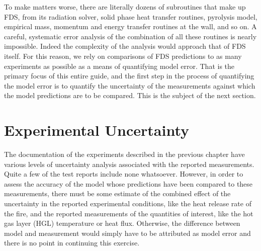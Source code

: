 To make matters worse, there are literally dozens of subroutines that make up FDS, from its radiation solver, solid phase heat transfer routines, pyrolysis model,
empirical mass, momentum and energy transfer routines at the wall, and so on. A careful, systematic error analysis of the combination of all these routines is
nearly impossible. Indeed the complexity of the analysis would approach that of FDS itself. For this reason, we rely on comparisons of FDS predictions to as many
experiments as possible as a means of quantifying model error. That is the primary focus of this entire guide, and the first step in the process of quantifying the
model error is to quantify the uncertainty of the measurements against which the model predictions are to be compared. This is the subject of the next section.


\section{Experimental Uncertainty}

The documentation of the experiments described in the previous chapter have various levels of uncertainty analysis associated with the reported measurements. Quite a
few of the test reports include none whatsoever.
However, in order to assess the accuracy of the model whose predictions have been compared to these measurements, there must be some estimate of the
combined effect of the uncertainty in the reported experimental conditions, like the heat release rate of the fire,
and the reported measurements of the quantities of interest, like the hot gas layer (HGL)
temperature or heat flux. Otherwise, the difference between model and measurement would simply have to be attributed as model error and there is no point in
continuing this exercise.

